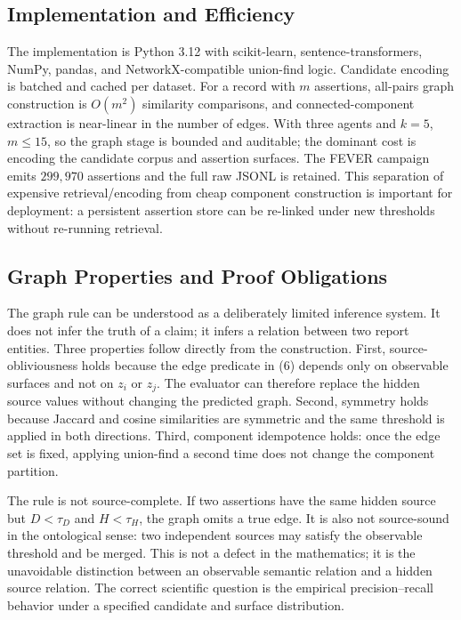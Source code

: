 \documentclass{ieeeaccess}
\begin{document}
\subsection{Implementation and Efficiency}
The implementation is Python 3.12 with scikit-learn, sentence-transformers, NumPy, pandas, and NetworkX-compatible union-find logic. Candidate encoding is batched and cached per dataset. For a record with $m$ assertions, all-pairs graph construction is $O(m^2)$ similarity comparisons, and connected-component extraction is near-linear in the number of edges. With three agents and $k=5$, $m\leq15$, so the graph stage is bounded and auditable; the dominant cost is encoding the candidate corpus and assertion surfaces. The FEVER campaign emits $299,970$ assertions and the full raw JSONL is retained. This separation of expensive retrieval/encoding from cheap component construction is important for deployment: a persistent assertion store can be re-linked under new thresholds without re-running retrieval.

\subsection{Graph Properties and Proof Obligations}
The graph rule can be understood as a deliberately limited inference system. It does not infer the truth of a claim; it infers a relation between two report entities. Three properties follow directly from the construction. First, source-obliviousness holds because the edge predicate in (6) depends only on observable surfaces and not on $z_i$ or $z_j$. The evaluator can therefore replace the hidden source values without changing the predicted graph. Second, symmetry holds because Jaccard and cosine similarities are symmetric and the same threshold is applied in both directions. Third, component idempotence holds: once the edge set is fixed, applying union-find a second time does not change the component partition.

The rule is not source-complete. If two assertions have the same hidden source but $D<\tau_D$ and $H<\tau_H$, the graph omits a true edge. It is also not source-sound in the ontological sense: two independent sources may satisfy the observable threshold and be merged. This is not a defect in the mathematics; it is the unavoidable distinction between an observable semantic relation and a hidden source relation. The correct scientific question is the empirical precision--recall behavior under a specified candidate and surface distribution.
\end{document}
